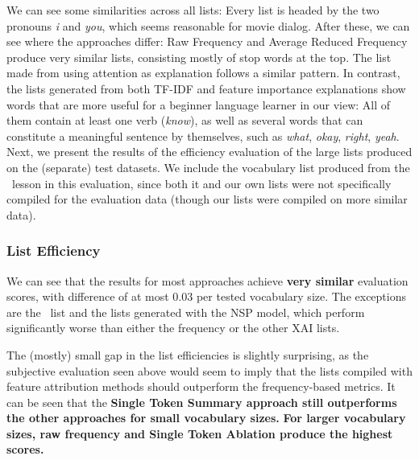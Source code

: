 We can see some similarities across all lists:
Every list is headed by the two pronouns \textit{i} and \textit{you}, which seems reasonable for movie dialog.
After these, we can see where the approaches differ:
Raw Frequency and Average Reduced Frequency produce very similar lists, consisting mostly of stop words at the top.
The list made from using attention as explanation follows a similar pattern.
In contrast, the lists generated from both TF-IDF and feature importance explanations show words that are more useful for a beginner language learner in our view:
All of them contain at least one verb (\textit{know}), as well as several words that can constitute a meaningful sentence by themselves, such as \textit{what}, \textit{okay}, \textit{right}, \textit{yeah}.
Next, we present the results of the efficiency evaluation of the large lists produced on the (separate) test datasets.
We include the vocabulary list produced from the \Rosetta\ lesson in this evaluation, since both it and our own lists were not specifically compiled for the evaluation data (though our lists were compiled on more similar data).


% 		
%
%
% 		


\subsubsection{List Efficiency}


We can see that the results for most approaches achieve \textbf{very similar} evaluation scores, with difference of at most 0.03 per tested vocabulary size.
The exceptions are the \Rosetta\ list and the lists generated with the NSP model, which perform significantly worse than either the frequency or the other XAI lists.

The (mostly) small gap in the list efficiencies is slightly surprising, as the subjective evaluation seen above would seem to imply that the lists compiled with feature attribution methods should outperform the frequency-based metrics.
It can be seen that the \textbf{Single Token Summary approach still outperforms the other approaches for small vocabulary sizes.}
\textbf{For larger vocabulary sizes, raw frequency and Single Token Ablation produce the highest scores.}

